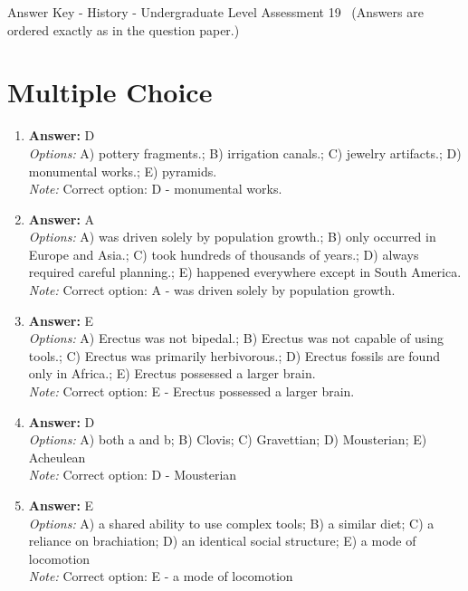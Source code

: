 \documentclass[12pt]{article}
\begin{document}
\begin{center}
Answer Key - History - Undergraduate Level Assessment 19 \
\small (Answers are ordered exactly as in the question paper.)
\end{center}

\section*{Multiple Choice}
\begin{enumerate}[label=\arabic*.]
\item \textbf{Answer:} D
\\ \textit{Options:} A) pottery fragments.; B) irrigation canals.; C) jewelry artifacts.; D) monumental works.; E) pyramids.
\\ \textit{Note:} Correct option: D - monumental works.
\item \textbf{Answer:} A
\\ \textit{Options:} A) was driven solely by population growth.; B) only occurred in Europe and Asia.; C) took hundreds of thousands of years.; D) always required careful planning.; E) happened everywhere except in South America.
\\ \textit{Note:} Correct option: A - was driven solely by population growth.
\item \textbf{Answer:} E
\\ \textit{Options:} A) Erectus was not bipedal.; B) Erectus was not capable of using tools.; C) Erectus was primarily herbivorous.; D) Erectus fossils are found only in Africa.; E) Erectus possessed a larger brain.
\\ \textit{Note:} Correct option: E - Erectus possessed a larger brain.
\item \textbf{Answer:} D
\\ \textit{Options:} A) both a and b; B) Clovis; C) Gravettian; D) Mousterian; E) Acheulean
\\ \textit{Note:} Correct option: D - Mousterian
\item \textbf{Answer:} E
\\ \textit{Options:} A) a shared ability to use complex tools; B) a similar diet; C) a reliance on brachiation; D) an identical social structure; E) a mode of locomotion
\\ \textit{Note:} Correct option: E - a mode of locomotion
\end{enumerate}
\end{document}

